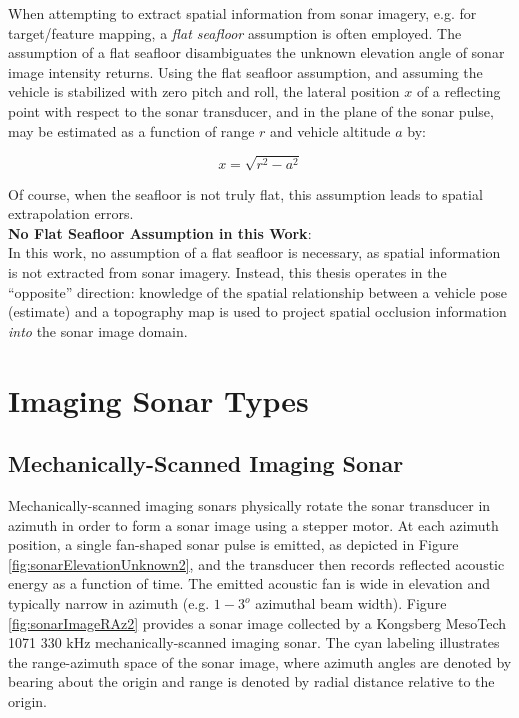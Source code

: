 When attempting to extract spatial information from sonar imagery, e.g. for target/feature mapping, a \emph{flat seafloor} assumption is often employed.
The assumption of a flat seafloor disambiguates the unknown elevation angle of sonar image intensity returns.
Using the flat seafloor assumption, and assuming the vehicle is stabilized with zero pitch and roll, the lateral position $x$ of a reflecting point with respect to the sonar transducer, and in the plane of the sonar pulse, may be estimated as a function of range $r$ and vehicle altitude $a$ by:

\begin{equation}
x = \sqrt{r^2 - a^2}
\end{equation}

\noindent Of course, when the seafloor is not truly flat, this assumption leads to spatial extrapolation errors.
\\

\noindent \textbf{No Flat Seafloor Assumption in this Work}:
\\

In this work, no assumption of a flat seafloor is necessary, as spatial information is not extracted from sonar imagery.
Instead, this thesis operates in the ``opposite'' direction: knowledge of the spatial relationship between a vehicle pose (estimate) and a topography map is used to project spatial occlusion information \emph{into} the sonar image domain.

\section{Imaging Sonar Types}
\label{sonar.Types}

\subsection{Mechanically-Scanned Imaging Sonar}
\label{sonar.Types.Mechanically}

Mechanically-scanned imaging sonars physically rotate the sonar transducer in azimuth in order to form a sonar image using a stepper motor.  
At each azimuth position, a single fan-shaped sonar pulse is emitted, as depicted in Figure \ref{fig:sonarElevationUnknown2}, and the transducer then records reflected acoustic energy as a function of time.
The emitted acoustic fan is wide in elevation and typically narrow in azimuth (e.g. $1-3^{o}$ azimuthal beam width).
Figure \ref{fig:sonarImageRAz2} provides a sonar image collected by a Kongsberg MesoTech 1071 330 kHz mechanically-scanned imaging sonar.  
The cyan labeling illustrates the range-azimuth space of the sonar image, where azimuth angles are denoted by bearing about the origin and range is denoted by radial distance relative to the origin.

